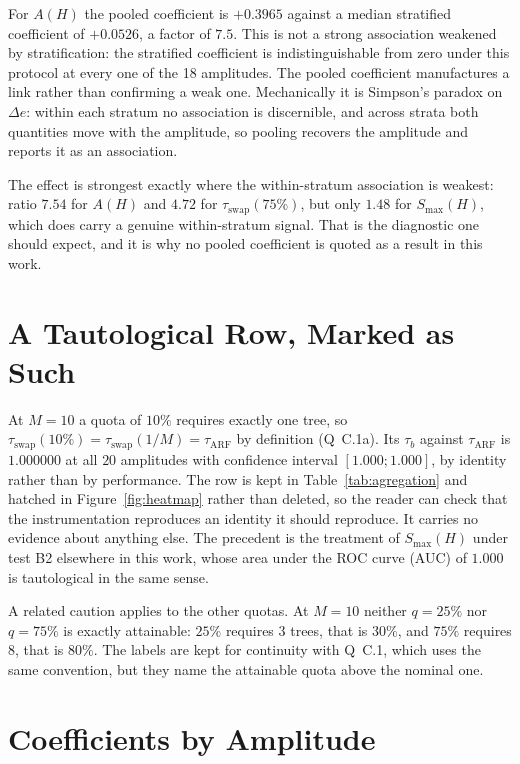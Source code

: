 \documentclass[11pt,a4paper]{article}
\begin{document}
For $A(H)$ the pooled coefficient is $+0.3965$ against a median stratified coefficient of
$+0.0526$, a factor of $7.5$. This is not a strong association weakened by stratification:
the stratified coefficient is indistinguishable from zero under this protocol at every one
of the 18 amplitudes. The pooled coefficient manufactures a link rather than confirming a
weak one. Mechanically it is Simpson's paradox on $\Delta e$: within each stratum no
association is discernible, and across strata both quantities move with the amplitude, so pooling recovers the
amplitude and reports it as an association.

The effect is strongest exactly where the within-stratum association is weakest: ratio
$7.54$ for $A(H)$ and $4.72$ for $\tau_{\mathrm{swap}}(75\%)$, but only $1.48$ for
$S_{\max}(H)$, which does carry a genuine within-stratum signal. That is the diagnostic one
should expect, and it is why no pooled coefficient is quoted as a result in this work.

\section{A Tautological Row, Marked as Such}
\label{sec:tauto}

At $M = 10$ a quota of $10\%$ requires exactly one tree, so
$\tau_{\mathrm{swap}}(10\%) = \tau_{\mathrm{swap}}(1/M) = \tau_{\mathrm{ARF}}$ by
definition (Q~C.1a). Its $\tau_b$ against $\tau_{\mathrm{ARF}}$ is $1.000000$ at all
$20$ amplitudes with confidence interval $[1.000 ; 1.000]$, by identity rather than by
performance. The row is kept in Table~\ref{tab:agregation} and hatched in
Figure~\ref{fig:heatmap} rather than deleted, so the reader can check that the
instrumentation reproduces an identity it should reproduce. It carries no evidence about
anything else. The precedent is the treatment of $S_{\max}(H)$ under test B2 elsewhere in
this work, whose area under the ROC curve (AUC) of $1.000$ is tautological in the same
sense.

A related caution applies to the other quotas. At $M = 10$ neither $q = 25\%$ nor
$q = 75\%$ is exactly attainable: $25\%$ requires $3$ trees, that is $30\%$, and $75\%$
requires $8$, that is $80\%$. The labels are kept for continuity with Q~C.1, which uses the
same convention, but they name the attainable quota above the nominal one.

\section{Coefficients by Amplitude}
\end{document}
